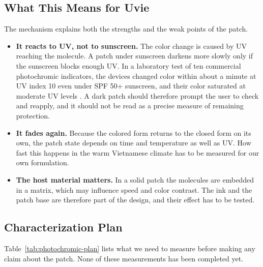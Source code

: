 \subsection{What This Means for Uvie}
The mechanism explains both the strengths and the weak points of the patch.
\begin{itemize}[itemsep=0pt]
  \item \textbf{It reacts to UV, not to sunscreen.} The color change is caused by UV reaching the
    molecule. A patch under sunscreen darkens more slowly only if the sunscreen blocks enough UV.
    In a laboratory test of ten commercial photochromic indicators, the devices changed color within
    about a minute at UV index 10 even under SPF 50+ sunscreen, and their color saturated at moderate
    UV levels \cite{aguilera2024}. A dark patch should therefore prompt the user to check and reapply,
    and it should not be read as a precise measure of remaining protection.
  \item \textbf{It fades again.} Because the colored form returns to the closed form on its own, the
    patch state depends on time and temperature as well as UV. How fast this happens in the warm
    Vietnamese climate has to be measured for our own formulation.
  \item \textbf{The host material matters.} In a solid patch the molecules are embedded in a matrix,
    which may influence speed and color contrast. The ink and the patch base are therefore part of
    the design, and their effect has to be tested.
\end{itemize}

\subsection{Characterization Plan}
Table~\ref{tab:photochromic-plan} lists what we need to measure before making any claim about the
patch. None of these measurements has been completed yet.

